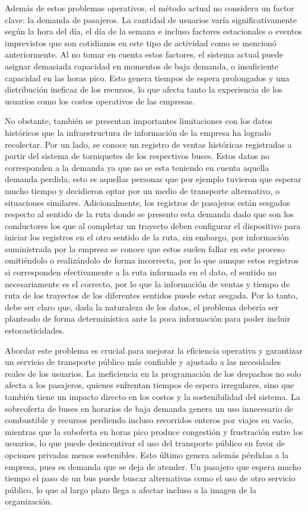 \documentclass[preprint,11pt]{elsarticle}
\begin{document}
Además de estos problemas operativos, el método actual no considera un factor clave: la demanda de pasajeros. La cantidad de usuarios varía significativamente según la hora del día, el día de la semana e incluso factores estacionales o eventos imprevistos que son cotidianos en este tipo de actividad como se mencionó anteriormente. Al no tomar en cuenta estos factores, el sistema actual puede asignar demasiada capacidad en momentos de baja demanda, o insuficiente capacidad en las horas pico. Esto genera tiempos de espera prolongados y una distribución ineficaz de los recursos, lo que afecta tanto la experiencia de los usuarios como los costos operativos de las empresas.

No obstante, también se presentan importantes limitaciones con los datos históricos que la infraestructura de información de la empresa ha logrado recolectar. Por un lado, se conoce un registro de ventas históricas registradas a partir del sistema de torniquetes de los respectivos buses. Estos datos no corresponden a la demanda ya que no se esta teniendo en cuenta aquella demanda perdida, esto es aquellas personas que por ejemplo tuvieron que esperar mucho tiempo y decidieron optar por un medio de transporte alternativo, o situaciones similares. Adicionalmente, los registros de pasajeros están sesgados respecto al sentido de la ruta donde se presento esta demanda dado que son los conductores los que al completar un trayecto deben configurar el dispositivo para iniciar los registros en el otro sentido de la ruta, sin embargo, por información suministrada por la empresa se conoce que estos suelen fallar en este proceso omitiéndolo o realizándolo de forma incorrecta, por lo que aunque estos registros si corresponden efectivamente a la ruta informada en el dato, el sentido no necesariamente es el correcto, por lo que la información de ventas y tiempo de ruta de los trayectos de los diferentes sentidos puede estar sesgada. Por lo tanto, debe ser claro que, dada la naturaleza de los datos, el problema debería ser planteado de forma determinística ante la poca información para poder incluir estocasticidades.

Abordar este problema es crucial para mejorar la eficiencia operativa y garantizar un servicio de transporte público más confiable y ajustado a las necesidades reales de los usuarios. La ineficiencia en la programación de los despachos no solo afecta a los pasajeros, quienes enfrentan tiempos de espera irregulares, sino que también tiene un impacto directo en los costos y la sostenibilidad del sistema. La sobreoferta de buses en horarios de baja demanda genera un uso innecesario de combustible y recursos perdiendo incluso recorridos enteros por viajes en vacío, mientras que la suboferta en horas pico produce congestión y frustración entre los usuarios, lo que puede desincentivar el uso del transporte público en favor de opciones privadas menos sostenibles. Esto último genera además pérdidas a la empresa, pues es demanda que se deja de atender. Un pasajero que espera mucho tiempo el paso de un bus puede buscar alternativas como el uso de otro servicio público, lo que al largo plazo llega a afectar incluso a la imagen de la organización.
\end{document}
